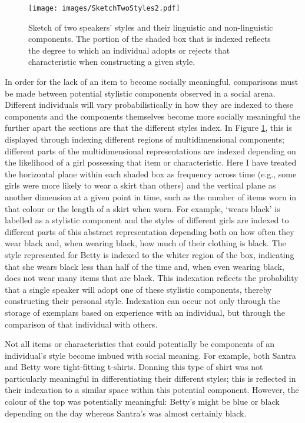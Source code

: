 \begin{figure}
	\centering
		\texttt{[image: images/SketchTwoStyles2.pdf]}
	\caption{Sketch of two speakers' styles and their linguistic and non-linguistic components.  The portion of the shaded box that is indexed reflects the degree to which an individual adopts or rejects that characteristic when constructing a given style.}
	\label{fig:SketchTwoStyles2}
\end{figure}



In order for the lack of an item to become socially meaningful, comparisons must be made between potential stylistic components observed in a social arena.  Different individuals will vary probabilistically in how they are indexed to these components and the components themselves become more socially meaningful the further apart the sections are that the different styles index.  In Figure \ref{fig:SketchTwoStyles2}, this is displayed through indexing different regions of multidimensional components; different parts of the multidimensional representations are indexed depending on the likelihood of a girl possessing that item or characteristic.  Here I have treated the horizontal plane within each shaded box as frequency across time (e.g., some girls were more likely to wear a skirt than others) and the vertical plane as another dimension at a given point in time, such as the number of items worn in that colour or the length of a skirt when worn.  For example, `wears black' is labelled as a stylistic component and the styles of different girls are indexed to different parts of this abstract representation depending both on how often they wear black and, when wearing black, how much of their clothing is black.  The style represented for Betty is indexed to the whiter region of the box, indicating that she wears black less than half of the time and, when even wearing black, does not wear many items that are black.  This indexation reflects the probability that a single speaker will adopt one of these stylistic components, thereby constructing their personal style.  Indexation can occur not only through the storage of exemplars based on experience with an individual, but through the comparison of that individual with others.  

Not all items or characteristics that could potentially be components of an individual's style become imbued with social meaning.  For example, both Santra and Betty wore tight-fitting t-shirts.  Donning this type of shirt was not particularly meaningful in differentiating their different styles; this is reflected in their indexation to a similar space within this potential component.  However, the colour of the top was potentially meaningful: Betty's might be blue or black depending on the day whereas Santra's was almost certainly black.  

